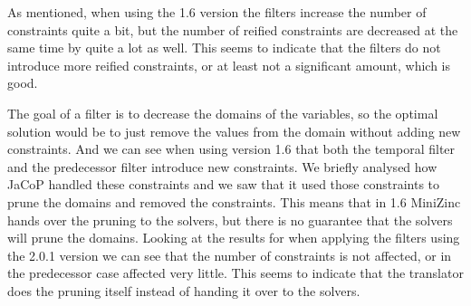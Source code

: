 As mentioned, when using the 1.6 version the filters increase the number of constraints quite a bit, but the number of reified constraints are decreased at the same time by quite a lot as well. This seems to indicate that the filters do not introduce more reified constraints, or at least not a significant amount, which is good.

The goal of a filter is to decrease the domains of the variables, so the optimal solution would be to just remove the values from the domain without adding new constraints. And we can see when using version 1.6 that both the temporal filter and the predecessor filter introduce new constraints. We briefly analysed how JaCoP handled these constraints and we saw that it used those constraints to prune the domains and removed the constraints. This means that in 1.6 MiniZinc hands over the pruning to the solvers, but there is no guarantee that the solvers will prune the domains. Looking at the results for when applying the filters using the 2.0.1 version we can see that the number of constraints is not affected, or in the predecessor case affected very little. This seems to indicate that the translator does the pruning itself instead of handing it over to the solvers.



